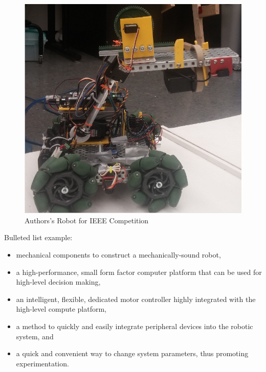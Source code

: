 \documentclass[12pt,oneside,final]{siuethesis}
\theoremstyle{definition}
\begin{document}
\begin{figure}[htbp!]
\centering
\includegraphics[scale=.6,keepaspectratio=true]{./images/FaberRobot.png} 
\caption{Authors's Robot for IEEE Competition}
\label{fig:FaberRobot}
\end{figure}

Bulleted list example:

\begin{itemize}
\item 
mechanical components to construct a mechanically-sound robot,
\item
a high-performance, small form factor computer platform that can be used for high-level decision making,
\item
an intelligent, flexible, dedicated motor controller highly integrated with the high-level compute platform, 
\item
a method to quickly and easily integrate peripheral devices into the robotic system, and
\item
a quick and convenient way to change system parameters, thus promoting experimentation.
\end{itemize}
\end{document}

